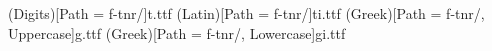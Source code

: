\usepackage{mathspec}

\setmainfont[
	Path = f-tnr/,
	BoldFont=tb.ttf,
	ItalicFont=ti.ttf,
	BoldItalicFont=tbi.ttf
		]{t.ttf}
		
\setmathfont(Digits)[Path = f-tnr/]{t.ttf}
\setmathfont(Latin)[Path = f-tnr/]{ti.ttf}
\setmathfont(Greek)[Path = f-tnr/, Uppercase]{g.ttf}
\setmathfont(Greek)[Path = f-tnr/, Lowercase]{gi.ttf}

\setmonofont[Path = f/]{pmono.ttf}
